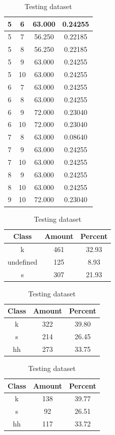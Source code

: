 \begin{table}
\begin{subtable}[tbp]{0.45\textwidth}
{\begin{tabular}{|c|c|c|c|}
 5 & 6 & 63.000 & 0.24255\\ \hline 
 5 & 7 & 56.250 & 0.22185\\ \hline 
 5 & 8 & 56.250 & 0.22185\\ \hline 
 5 & 9 & 63.000 & 0.24255\\ \hline 
 5 & 10 & 63.000 & 0.24255\\ \hline 
 6 & 7 & 63.000 & 0.24255\\ \hline 
 6 & 8 & 63.000 & 0.24255\\ \hline 
 6 & 9 & 72.000 & 0.23040\\ \hline 
 6 & 10 & 72.000 & 0.23040\\ \hline 
 7 & 8 & 63.000 & 0.08640\\ \hline 
 7 & 9 & 63.000 & 0.24255\\ \hline 
 7 & 10 & 63.000 & 0.24255\\ \hline 
 8 & 9 & 63.000 & 0.24255\\ \hline 
 8 & 10 & 63.000 & 0.24255\\ \hline 
 9 & 10 & 72.000 & 0.23040\\ \hline 

\end{tabular}
}\caption{xcsskew2010} \label{xlsskew2010}

\end{subtable}

\begin{subtable}[tbp]{0.45\textwidth}
\centering
\begin{tabular}{|c|c|c|}
\hline
Class & Amount & Percent\\ \hline
k & 461 & 32.93\\ \hline
undefined & 125 & 8.93\\ \hline
s & 307 & 21.93\\ \hline
\end{tabular}
\caption{Entire dataset after stripping short sounds}
\end{subtable}
\hfill
\begin{subtable}[tbp]{0.45\textwidth}
\centering
\begin{tabular}{|c|c|c|}
\hline
Class & Amount & Percent\\ \hline
k & 322 & 39.80\\ \hline
s & 214 & 26.45\\ \hline
hh & 273 & 33.75\\ \hline
\end{tabular}
\caption{Training dataset}
\end{subtable}
\hfill
\begin{subtable}[tbp]{0.45\textwidth}
\centering
\begin{tabular}{|c|c|c|}
\hline
Class & Amount & Percent\\ \hline
k & 138 & 39.77\\ \hline
s & 92 & 26.51\\ \hline
hh & 117 & 33.72\\ \hline
\end{tabular}
\caption{Testing dataset}
\end{subtable}
\hfill


\end{table}
